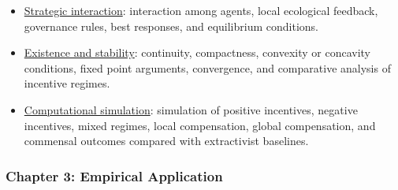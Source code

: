 \begin{itemize}
\begin{itemize}
        \item[iv.] \underline{Strategic interaction}: interaction among agents, local ecological feedback, governance rules, best responses, and equilibrium conditions.

        \item[v.] \underline{Existence and stability}: continuity, compactness, convexity or concavity conditions, fixed point arguments, convergence, and comparative analysis of incentive regimes.

        \item[vi.] \underline{Computational simulation}: simulation of positive incentives, negative incentives, mixed regimes, local compensation, global compensation, and commensal outcomes compared with extractivist baselines.

    \end{itemize}

\end{itemize}

\subsubsection{Chapter 3: Empirical Application}

